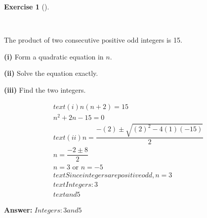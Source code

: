 \documentclass[
  letterpaper,
  DIV=11,
  numbers=noendperiod]{scrreprt}
\theoremstyle{definition}
\newtheorem{exercise}{Exercise}[chapter]
\theoremstyle{remark}
\begin{document}
\begin{exercise}[]\protect\hypertarget{exr-u6-26-3}{}\label{exr-u6-26-3}

~

The product of two consecutive positive odd integers is 15.

\textbf{(i)} Form a quadratic equation in \(n\).

\textbf{(ii)} Solve the equation exactly.

\textbf{(iii)} Find the two integers.

\begin{tcolorbox}[enhanced jigsaw, opacitybacktitle=0.6, coltitle=black, arc=.35mm, colframe=quarto-callout-tip-color-frame, colback=white, bottomrule=.15mm, left=2mm, colbacktitle=quarto-callout-tip-color!10!white, titlerule=0mm, opacityback=0, title=\textcolor{quarto-callout-tip-color}{\faLightbulb}\hspace{0.5em}{🔍 View Solution}, leftrule=.75mm, breakable, rightrule=.15mm, bottomtitle=1mm, toptitle=1mm, toprule=.15mm]

\begin{align*}
text{(i) } n(n+2) = 15 \\ n^2 + 2n - 15 = 0 \\ text{(ii) } n = \dfrac{-(2) \pm \sqrt{(2)^2 - 4(1)(-15)}}{2} \\ n = \dfrac{-2 \pm 8}{2} \\ n = 3 \text{ or } n = -5 \\ text{Since integers are positive odd, } n = 3 \\ text{Integers: } 3 \\ text{ and } 5
\end{align*}

\textbf{Answer:} \(Integers: 3 and 5\)

\end{tcolorbox}

\end{exercise}
\end{document}
